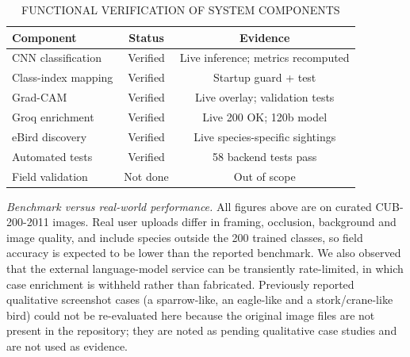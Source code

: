\documentclass[conference]{IEEEtran}
\begin{document}
\begin{table}[t]
\centering
\caption{FUNCTIONAL VERIFICATION OF SYSTEM COMPONENTS}
\label{tab:VII}
\footnotesize
\begin{tabular}{lcc}
\toprule
\textbf{Component} & \textbf{Status} & \textbf{Evidence} \\
\midrule
CNN classification & Verified & Live inference; metrics recomputed \\
Class-index mapping & Verified & Startup guard + test \\
Grad-CAM & Verified & Live overlay; validation tests \\
Groq enrichment & Verified & Live 200 OK; 120b model \\
eBird discovery & Verified & Live species-specific sightings \\
Automated tests & Verified & 58 backend tests pass \\
Field validation & Not done & Out of scope \\
\bottomrule
\end{tabular}
\end{table}
\textit{Benchmark versus real-world performance.} All figures above are on curated CUB-200-2011 images. Real user uploads differ in framing, occlusion, background and image quality, and include species outside the 200 trained classes, so field accuracy is expected to be lower than the reported benchmark. We also observed that the external language-model service can be transiently rate-limited, in which case enrichment is withheld rather than fabricated. Previously reported qualitative screenshot cases (a sparrow-like, an eagle-like and a stork/crane-like bird) could not be re-evaluated here because the original image files are not present in the repository; they are noted as pending qualitative case studies and are not used as evidence.
\end{document}
